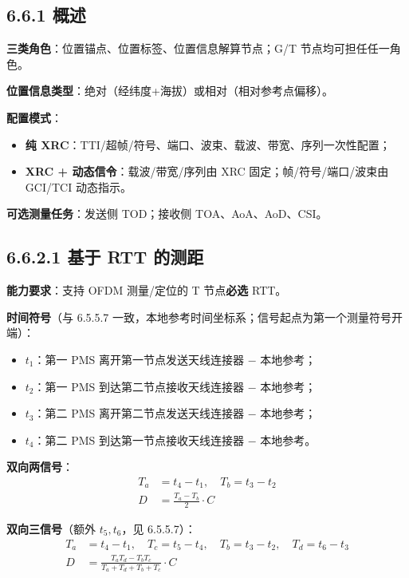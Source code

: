 \documentclass[11pt,a4paper]{ctexart}
\begin{document}
\subsection{6.6.1 概述}

\textbf{三类角色}：位置锚点、位置标签、位置信息解算节点；G/T 节点均可担任任一角色。

\textbf{位置信息类型}：绝对（经纬度+海拔）或相对（相对参考点偏移）。

\textbf{配置模式}：
\begin{itemize}[nosep]
  \item \textbf{纯 XRC}：TTI/超帧/符号、端口、波束、载波、带宽、序列一次性配置；
  \item \textbf{XRC + 动态信令}：载波/带宽/序列由 XRC 固定；帧/符号/端口/波束由 GCI/TCI 动态指示。
\end{itemize}

\textbf{可选测量任务}：发送侧 TOD；接收侧 TOA、AoA、AoD、CSI。

\subsection{6.6.2.1 基于 RTT 的测距}

\textbf{能力要求}：支持 OFDM 测量/定位的 T 节点\textbf{必选} RTT。

\textbf{时间符号}（与 6.5.5.7 一致，本地参考时间坐标系；信号起点为第一个测量符号开端）：
\begin{itemize}[nosep]
  \item $t_1$：第一 PMS 离开第一节点发送天线连接器 $-$ 本地参考；
  \item $t_2$：第一 PMS 到达第二节点接收天线连接器 $-$ 本地参考；
  \item $t_3$：第二 PMS 离开第二节点发送天线连接器 $-$ 本地参考；
  \item $t_4$：第二 PMS 到达第一节点接收天线连接器 $-$ 本地参考。
\end{itemize}

\textbf{双向两信号}：
\begin{align}
T_a &= t_4 - t_1, \quad T_b = t_3 - t_2 \\
D &= \frac{T_a - T_b}{2} \cdot C
\end{align}

\textbf{双向三信号}（额外 $t_5,t_6$，见 6.5.5.7）：
\begin{align}
T_a &= t_4 - t_1, \quad T_c = t_5 - t_4, \quad
T_b = t_3 - t_2, \quad T_d = t_6 - t_3 \\
D &= \frac{T_a T_d - T_b T_c}{T_a + T_d + T_b + T_c} \cdot C
\end{align}
\end{document}
